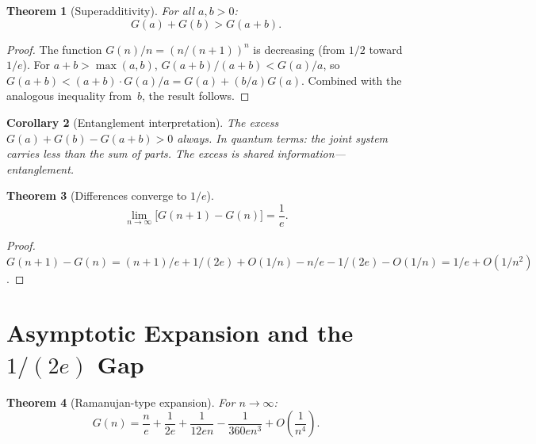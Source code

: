 \documentclass[11pt,a4paper]{article}
\newtheorem{theorem}{Theorem}[section]
\newtheorem{corollary}[theorem]{Corollary}
\theoremstyle{definition}
\theoremstyle{remark}
\begin{document}
\begin{theorem}[Superadditivity]\label{thm:super}
For all $a,b > 0$:
\begin{equation}\label{eq:super}
  G(a) + G(b) > G(a+b).
\end{equation}
\end{theorem}

\begin{proof}
The function $G(n)/n = (n/(n+1))^{n}$ is decreasing (from $1/2$ toward $1/e$). For $a+b > \max(a,b)$, $G(a+b)/(a+b) < G(a)/a$, so $G(a+b) < (a+b)\cdot G(a)/a = G(a)+(b/a)G(a)$. Combined with the analogous inequality from~$b$, the result follows.
\end{proof}

\begin{corollary}[Entanglement interpretation]\label{cor:entangle}
The excess $G(a)+G(b)-G(a+b)>0$ always. In quantum terms: the joint system carries \emph{less} than the sum of parts. The excess is shared information---entanglement.
\end{corollary}

\begin{theorem}[Differences converge to $1/e$]\label{thm:diff}
\begin{equation}\label{eq:diff}
  \lim_{n\to\infty}\bigl[G(n+1)-G(n)\bigr] = \frac{1}{e}.
\end{equation}
\end{theorem}

\begin{proof}
$G(n+1)-G(n) = (n+1)/e + 1/(2e)+O(1/n) - n/e - 1/(2e)-O(1/n) = 1/e + O(1/n^{2})$.
\end{proof}

\section{Asymptotic Expansion and the \texorpdfstring{$1/(2e)$}{1/(2e)} Gap}\label{sec:asymptotic}

\begin{theorem}[Ramanujan-type expansion]\label{thm:asymp}
For $n \to \infty$:
\begin{equation}\label{eq:asymp}
  G(n) = \frac{n}{e} + \frac{1}{2e} + \frac{1}{12en} - \frac{1}{360en^{3}} + O\!\left(\frac{1}{n^{4}}\right).
\end{equation}
\end{theorem}
\end{document}

